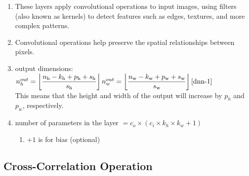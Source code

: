 \begin{enumerate}[itemsep=0.2cm]
    \item These layers apply convolutional operations to input images, using filters (also known as kernels) to detect features such as edges, textures, and more complex patterns. 
    
    \item Convolutional operations help preserve the spatial relationships between pixels.

    \item[] output dimensions: 
    $
        \hfill
        n^{out}_h=\dfloor{\dfrac{n_\textrm{h}-k_\textrm{h}+p_\textrm{h}+s_\textrm{h}}{s_\textrm{h}}}
        \hfill 
        n^{out}_w=\dfloor{\dfrac{n_\textrm{w}-k_\textrm{w}+p_\textrm{w}+s_\textrm{w}}{s_\textrm{w}}}
        \hfill
        \text{\cite{dnn-1}}
    $\\
    This means that the height and width of the output will increase by $p_h$ and $p_w$, respectively.

    \item[] number of parameters in the layer $= c_o \times ( c_i \times k_h \times k_w + 1)$
    \begin{enumerate}
        \item $+1$ is for bias (optional)

    \end{enumerate}
\end{enumerate}


\subsection{Cross-Correlation Operation \cite{dnn-1}} \label{Cross-Correlation Operation}

